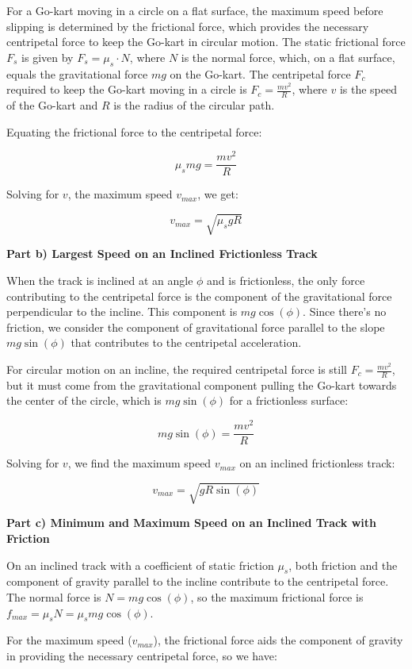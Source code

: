 \documentclass[a4paper,11pt]{article}
\begin{document}
For a Go-kart moving in a circle on a flat surface, the maximum speed before slipping is determined by the frictional force, which provides the necessary centripetal force to keep the Go-kart in circular motion. The static frictional force \(F_{s}\) is given by \(F_{s} = \mu_{s} \cdot N\), where \(N\) is the normal force, which, on a flat surface, equals the gravitational force \(mg\) on the Go-kart. The centripetal force \(F_{c}\) required to keep the Go-kart moving in a circle is \(F_{c} = \frac{m v^2}{R}\), where \(v\) is the speed of the Go-kart and \(R\) is the radius of the circular path.

Equating the frictional force to the centripetal force:

\[
\mu_{s} mg = \frac{m v^2}{R}
\]

Solving for \(v\), the maximum speed \(v_{max}\), we get:

\[
v_{max} = \sqrt{\mu_{s} g R}
\]

\textbf{Part b) Largest Speed on an Inclined Frictionless Track}

When the track is inclined at an angle \(\phi\) and is frictionless, the only force contributing to the centripetal force is the component of the gravitational force perpendicular to the incline. This component is \(mg \cos(\phi)\). Since there's no friction, we consider the component of gravitational force parallel to the slope \(mg \sin(\phi)\) that contributes to the centripetal acceleration.

For circular motion on an incline, the required centripetal force is still \(F_{c} = \frac{m v^2}{R}\), but it must come from the gravitational component pulling the Go-kart towards the center of the circle, which is \(mg \sin(\phi)\) for a frictionless surface:

\[
mg \sin(\phi) = \frac{m v^2}{R}
\]

Solving for \(v\), we find the maximum speed \(v_{max}\) on an inclined frictionless track:

\[
v_{max} = \sqrt{g R \sin(\phi)}
\]

\textbf{Part c) Minimum and Maximum Speed on an Inclined Track with Friction}

On an inclined track with a coefficient of static friction \(\mu_{s}\), both friction and the component of gravity parallel to the incline contribute to the centripetal force. The normal force is \(N = mg \cos(\phi)\), so the maximum frictional force is \(f_{max} = \mu_{s} N = \mu_{s} mg \cos(\phi)\).

For the maximum speed (\(v_{max}\)), the frictional force aids the component of gravity in providing the necessary centripetal force, so we have:
\end{document}
